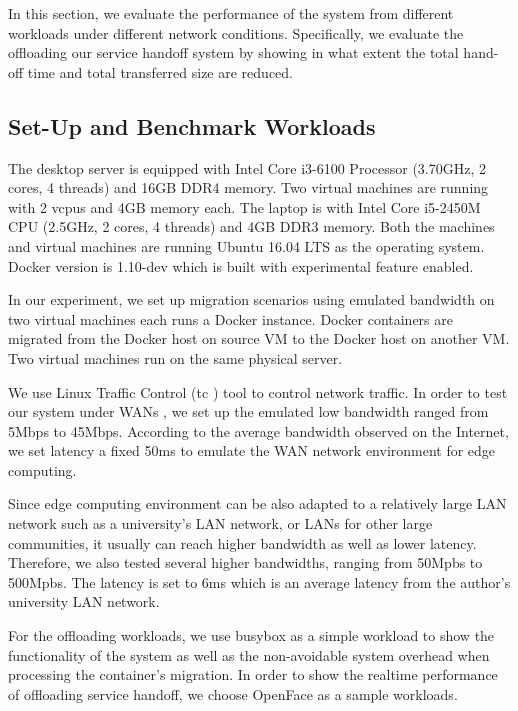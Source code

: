 
In this section, we evaluate the performance of the system from different workloads under different network conditions. 
Specifically, we evaluate the offloading our service handoff system by showing in what extent the total hand-off time and total transferred size are reduced.

\subsection{Set-Up and Benchmark Workloads}

The desktop server is equipped with Intel Core i3-6100 Processor (3.70GHz, 2 cores, 4 threads) and 16GB DDR4 memory. Two virtual machines are running with 2 vcpus and 4GB memory each.
The laptop is with Intel Core i5-2450M CPU (2.5GHz, 2 cores, 4 threads) and 4GB DDR3 memory. Both the machines and virtual machines are running Ubuntu 16.04 LTS as the operating system. Docker version is 1.10-dev which is built with experimental feature enabled.

In our experiment, we set up migration scenarios using 
emulated bandwidth on two virtual machines each runs a Docker instance.
Docker containers are migrated from the Docker host on source VM to the Docker host on another VM. 
Two virtual machines run on the same physical server. 

We use Linux Traffic Control (tc\cite{tc} )  tool to control network traffic. In order to test our system under WANs , we set up the emulated low bandwidth ranged from 5Mbps to 45Mbps. According to the average bandwidth observed on the Internet\cite{internet2014state}, we set  latency a fixed 50ms to emulate the WAN network environment for edge computing.

Since edge computing environment can be also adapted to a relatively large LAN network such as a university's LAN network, or LANs for other large communities, it usually can reach higher bandwidth as well as lower latency. Therefore, we also tested several higher bandwidths, ranging from 50Mpbs to 500Mpbs. The latency is set to 6ms which is an average latency from the author's university LAN network.

For the offloading workloads, we use busybox as a simple workload to show the functionality of the system as well as the non-avoidable system overhead when processing the container's migration. In order to show the realtime performance of offloading service handoff, we choose OpenFace as a sample workloads.

